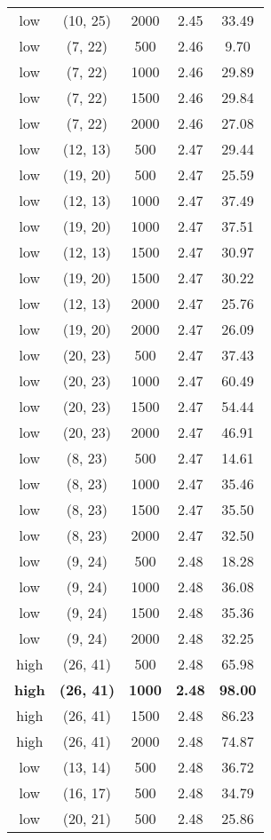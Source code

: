 \begin{tabular}{c c c c c}
low & (10, 25) &  2000 & 2.45 & 33.49 \\
low & (7, 22) &  500 & 2.46 & 9.70 \\
low & (7, 22) &  1000 & 2.46 & 29.89 \\
low & (7, 22) &  1500 & 2.46 & 29.84 \\
low & (7, 22) &  2000 & 2.46 & 27.08 \\
low & (12, 13) &  500 & 2.47 & 29.44 \\
low & (19, 20) &  500 & 2.47 & 25.59 \\
low & (12, 13) &  1000 & 2.47 & 37.49 \\
low & (19, 20) &  1000 & 2.47 & 37.51 \\
low & (12, 13) &  1500 & 2.47 & 30.97 \\
low & (19, 20) &  1500 & 2.47 & 30.22 \\
low & (12, 13) &  2000 & 2.47 & 25.76 \\
low & (19, 20) &  2000 & 2.47 & 26.09 \\
low & (20, 23) &  500 & 2.47 & 37.43 \\
low & (20, 23) &  1000 & 2.47 & 60.49 \\
low & (20, 23) &  1500 & 2.47 & 54.44 \\
low & (20, 23) &  2000 & 2.47 & 46.91 \\
low & (8, 23) &  500 & 2.47 & 14.61 \\
low & (8, 23) &  1000 & 2.47 & 35.46 \\
low & (8, 23) &  1500 & 2.47 & 35.50 \\
low & (8, 23) &  2000 & 2.47 & 32.50 \\
low & (9, 24) &  500 & 2.48 & 18.28 \\
low & (9, 24) &  1000 & 2.48 & 36.08 \\
low & (9, 24) &  1500 & 2.48 & 35.36 \\
low & (9, 24) &  2000 & 2.48 & 32.25 \\
high & (26, 41) &  500 & 2.48 & 65.98 \\
\textbf{high} & \textbf{(26, 41)} & \textbf{ 1000} & \textbf{2.48} & \textbf{98.00} \\
high & (26, 41) &  1500 & 2.48 & 86.23 \\
high & (26, 41) &  2000 & 2.48 & 74.87 \\
low & (13, 14) &  500 & 2.48 & 36.72 \\
low & (16, 17) &  500 & 2.48 & 34.79 \\
low & (20, 21) &  500 & 2.48 & 25.86 \\

\end{tabular}
